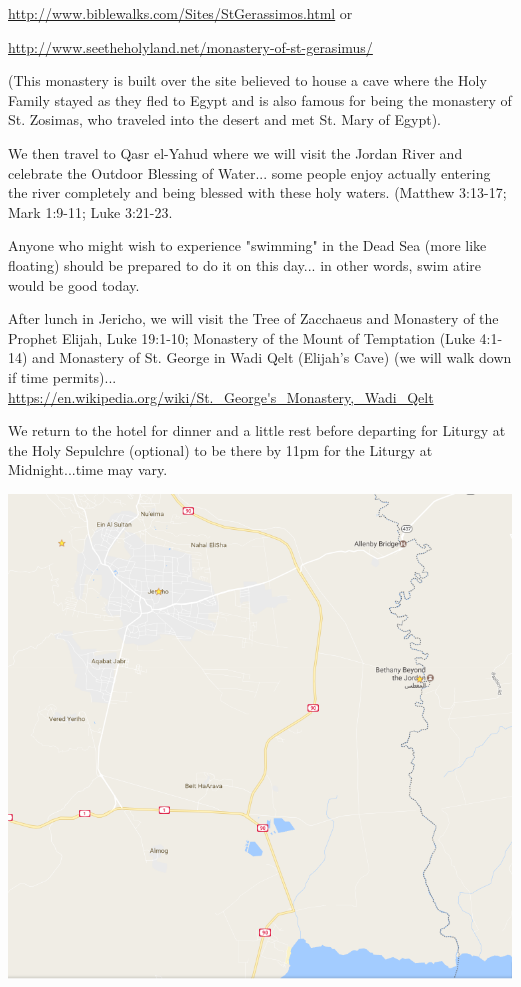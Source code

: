 \documentclass[letterpaper]{report}
\begin{document}
\url{http://www.biblewalks.com/Sites/StGerassimos.html}
or

\url{http://www.seetheholyland.net/monastery-of-st-gerasimus/}

(This monastery is built over the site believed to house a cave where the Holy 
Family stayed as they fled to Egypt and is also famous for being the monastery 
of St. Zosimas, who traveled into the desert and met St. Mary of Egypt).

We then travel to Qasr el-Yahud where we will visit the Jordan River and 
celebrate the Outdoor Blessing of Water...
some people enjoy actually entering the river completely and being blessed
with these holy waters.
(Matthew 3:13-17; Mark 1:9-11; Luke 3:21-23.

Anyone who might wish to experience "swimming" in the Dead Sea
(more like floating) should be prepared to do it on this day...
in other words, swim atire would be good today.

After lunch in Jericho,
we will visit the Tree of Zacchaeus and Monastery of the Prophet Elijah,
Luke 19:1-10;
Monastery of the Mount of Temptation (Luke 4:1-14)
and Monastery of St. George in Wadi Qelt (Elijah's Cave)
(we will walk down if time permits)...
\url{https://en.wikipedia.org/wiki/St._George's_Monastery,_Wadi_Qelt}

We return to the hotel for dinner and a little rest before departing for 
Liturgy at the Holy Sepulchre (optional)
to be there by 11pm for the Liturgy at Midnight...time may vary.

\includegraphics[width=\textwidth]{JordanDeadseaJerichoTemptation}
\end{document}
